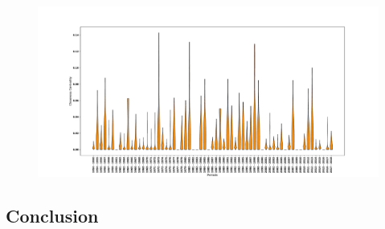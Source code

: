 \documentclass{article}
\theoremstyle{definition}
\begin{document}
\begin{figure}[!hbtp]
    \centering
    \includegraphics[width=\textwidth]{./assets/images/closeness_over_time.pdf}
\end{figure}

\begin{table}[!hbtp]
    \centering
    \begin{adjustbox}{totalheight=\baselineskip}
    }
\end{adjustbox}
\end{table}

\subsection{Conclusion}

\newpage


\end{document}
